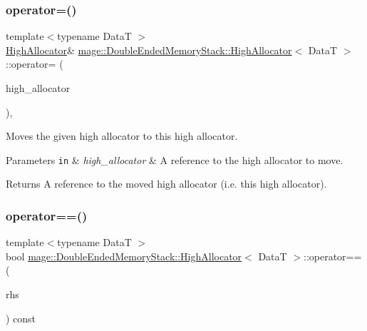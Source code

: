 \subsubsection{\texorpdfstring{operator=()}{operator=()}\hspace{0.1cm}{\footnotesize\ttfamily [2/2]}}
{\footnotesize\ttfamily template$<$typename DataT $>$ \\
\hyperlink{structmage_1_1_double_ended_memory_stack_1_1_high_allocator}{High\+Allocator}\& \hyperlink{structmage_1_1_double_ended_memory_stack_1_1_high_allocator}{mage\+::\+Double\+Ended\+Memory\+Stack\+::\+High\+Allocator}$<$ DataT $>$\+::operator= (\begin{DoxyParamCaption}\item[{\hyperlink{structmage_1_1_double_ended_memory_stack_1_1_high_allocator}{High\+Allocator}$<$ DataT $>$ \&\&}]{high\+\_\+allocator }\end{DoxyParamCaption})\hspace{0.3cm}{\ttfamily [delete]}, {\ttfamily [noexcept]}}

Moves the given high allocator to this high allocator.


\begin{DoxyParams}[1]{Parameters}
\mbox{\tt in}  & {\em high\+\_\+allocator} & A reference to the high allocator to move. \\
\hline
\end{DoxyParams}
\begin{DoxyReturn}{Returns}
A reference to the moved high allocator (i.\+e. this high allocator). 
\end{DoxyReturn}
\hypertarget{structmage_1_1_double_ended_memory_stack_1_1_high_allocator_af4a65b4f897a32ea1ddbe92dbea968f1}{}\label{structmage_1_1_double_ended_memory_stack_1_1_high_allocator_af4a65b4f897a32ea1ddbe92dbea968f1} 
\subsubsection{\texorpdfstring{operator==()}{operator==()}}
{\footnotesize\ttfamily template$<$typename DataT $>$ \\
bool \hyperlink{structmage_1_1_double_ended_memory_stack_1_1_high_allocator}{mage\+::\+Double\+Ended\+Memory\+Stack\+::\+High\+Allocator}$<$ DataT $>$\+::operator== (\begin{DoxyParamCaption}\item[{const \hyperlink{structmage_1_1_double_ended_memory_stack_1_1_high_allocator}{High\+Allocator}$<$ DataT $>$ \&}]{rhs }\end{DoxyParamCaption}) const\hspace{0.3cm}{\ttfamily [noexcept]}}


